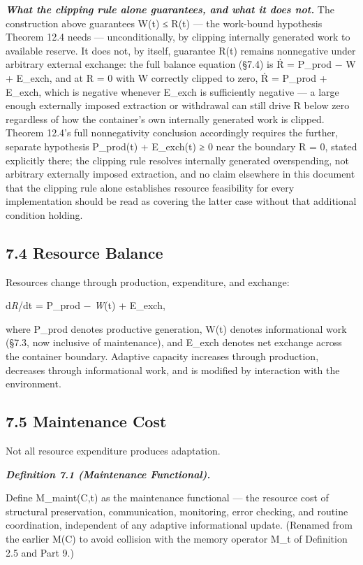 \documentclass[
]{article}
\begin{document}
\emph{\textbf{What the clipping rule alone guarantees, and what it does
not.}} The construction above guarantees W(t) ≤ R(t) --- the work-bound
hypothesis Theorem 12.4 needs --- unconditionally, by clipping
internally generated work to available reserve. It does not, by itself,
guarantee R(t) remains nonnegative under arbitrary external exchange:
the full balance equation (§7.4) is Ṙ = P\_prod − W + E\_exch, and at R
= 0 with W correctly clipped to zero, Ṙ = P\_prod + E\_exch, which is
negative whenever E\_exch is sufficiently negative --- a large enough
externally imposed extraction or withdrawal can still drive R below zero
regardless of how the container's own internally generated work is
clipped. Theorem 12.4's full nonnegativity conclusion accordingly
requires the further, separate hypothesis P\_prod(t) + E\_exch(t) ≥ 0
near the boundary R = 0, stated explicitly there; the clipping rule
resolves internally generated overspending, not arbitrary externally
imposed extraction, and no claim elsewhere in this document that the
clipping rule alone establishes resource feasibility for every
implementation should be read as covering the latter case without that
additional condition holding.

\hypertarget{resource-balance}{%
\subsection{7.4 Resource Balance}\label{resource-balance}}

Resources change through production, expenditure, and exchange:

d\emph{R}/dt = P\_prod − \emph{W}(t) + E\_exch,

where P\_prod denotes productive generation, W(t) denotes informational
work (§7.3, now inclusive of maintenance), and E\_exch denotes net
exchange across the container boundary. Adaptive capacity increases
through production, decreases through informational work, and is
modified by interaction with the environment.

\hypertarget{maintenance-cost}{%
\subsection{7.5 Maintenance Cost}\label{maintenance-cost}}

Not all resource expenditure produces adaptation.

\emph{\textbf{Definition 7.1 (Maintenance Functional).}}

Define M\_maint(C,t) as the maintenance functional --- the resource cost
of structural preservation, communication, monitoring, error checking,
and routine coordination, independent of any adaptive informational
update. (Renamed from the earlier M(C) to avoid collision with the
memory operator M\_t of Definition 2.5 and Part 9.)
\end{document}
